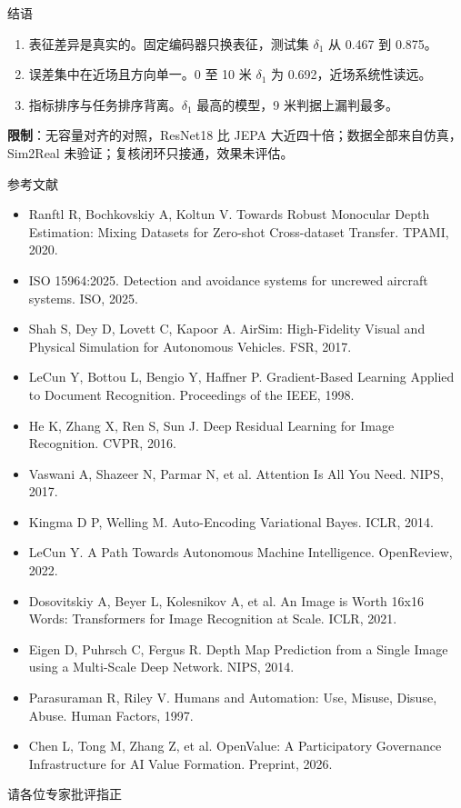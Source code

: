 \documentclass[serif, aspectratio=169]{beamer}
\newcommand{\currentref}{}
\newcommand{\src}[1]{\gdef\currentref{#1}}
\begin{document}
\begin{frame}{结语}

\begin{enumerate}
    \item 表征差异是真实的。固定编码器只换表征，测试集 $\delta_1$ 从 0.467 到 0.875。
    \item 误差集中在近场且方向单一。0 至 10 米 $\delta_1$ 为 0.692，近场系统性读远。
    \item 指标排序与任务排序背离。$\delta_1$ 最高的模型，9 米判据上漏判最多。
\end{enumerate}

\vspace{0.3cm}
\textbf{限制}：无容量对齐的对照，ResNet18 比 JEPA 大近四十倍；数据全部来自仿真，Sim2Real 未验证；复核闭环只接通，效果未评估。

\src{LeCun Y. A Path Towards Autonomous Machine Intelligence. OpenReview, 2022.}
\end{frame}

\begin{frame}{参考文献}

{\scriptsize
\begin{itemize}
    \item Ranftl R, Bochkovskiy A, Koltun V. Towards Robust Monocular Depth Estimation: Mixing Datasets for Zero-shot Cross-dataset Transfer. TPAMI, 2020.
    \item ISO 15964:2025. Detection and avoidance systems for uncrewed aircraft systems. ISO, 2025.
    \item Shah S, Dey D, Lovett C, Kapoor A. AirSim: High-Fidelity Visual and Physical Simulation for Autonomous Vehicles. FSR, 2017.
    \item LeCun Y, Bottou L, Bengio Y, Haffner P. Gradient-Based Learning Applied to Document Recognition. Proceedings of the IEEE, 1998.
    \item He K, Zhang X, Ren S, Sun J. Deep Residual Learning for Image Recognition. CVPR, 2016.
    \item Vaswani A, Shazeer N, Parmar N, et al. Attention Is All You Need. NIPS, 2017.
    \item Kingma D P, Welling M. Auto-Encoding Variational Bayes. ICLR, 2014.
    \item LeCun Y. A Path Towards Autonomous Machine Intelligence. OpenReview, 2022.
    \item Dosovitskiy A, Beyer L, Kolesnikov A, et al. An Image is Worth 16x16 Words: Transformers for Image Recognition at Scale. ICLR, 2021.
    \item Eigen D, Puhrsch C, Fergus R. Depth Map Prediction from a Single Image using a Multi-Scale Deep Network. NIPS, 2014.
    \item Parasuraman R, Riley V. Humans and Automation: Use, Misuse, Disuse, Abuse. Human Factors, 1997.
    \item Chen L, Tong M, Zhang Z, et al. OpenValue: A Participatory Governance Infrastructure for AI Value Formation. Preprint, 2026.
\end{itemize}}

\end{frame}

\begin{frame}{}
    \centering
    \vspace{2.2cm}
    {\Huge 请各位专家批评指正}
\end{frame}
\end{document}
